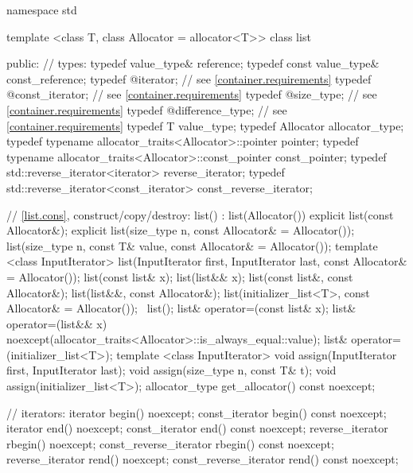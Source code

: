 \begin{codeblock}
namespace std {
  template <class T, class Allocator = allocator<T>>
  class list {
  public:
    // types:
    typedef value_type&                                         reference;
    typedef const value_type&                                   const_reference;
    typedef @\impdefnc@                              iterator;        // see \ref{container.requirements}
    typedef @\impdefnc@                              const_iterator;  // see \ref{container.requirements}
    typedef @\impdefnc@                              size_type;       // see \ref{container.requirements}
    typedef @\impdefnc@                              difference_type; // see \ref{container.requirements}
    typedef T                                                   value_type;
    typedef Allocator                                           allocator_type;
    typedef typename allocator_traits<Allocator>::pointer       pointer;
    typedef typename allocator_traits<Allocator>::const_pointer const_pointer;
    typedef std::reverse_iterator<iterator>                     reverse_iterator;
    typedef std::reverse_iterator<const_iterator>               const_reverse_iterator;

    // \ref{list.cons}, construct/copy/destroy:
    list() : list(Allocator()) { }
    explicit list(const Allocator&);
    explicit list(size_type n, const Allocator& = Allocator());
    list(size_type n, const T& value, const Allocator& = Allocator());
    template <class InputIterator>
      list(InputIterator first, InputIterator last, const Allocator& = Allocator());
    list(const list& x);
    list(list&& x);
    list(const list&, const Allocator&);
    list(list&&, const Allocator&);
    list(initializer_list<T>, const Allocator& = Allocator());
    ~list();
    list& operator=(const list& x);
    list& operator=(list&& x)
      noexcept(allocator_traits<Allocator>::is_always_equal::value);
    list& operator=(initializer_list<T>);
    template <class InputIterator>
      void assign(InputIterator first, InputIterator last);
    void assign(size_type n, const T& t);
    void assign(initializer_list<T>);
    allocator_type get_allocator() const noexcept;

    // iterators:
    iterator               begin() noexcept;
    const_iterator         begin() const noexcept;
    iterator               end() noexcept;
    const_iterator         end() const noexcept;
    reverse_iterator       rbegin() noexcept;
    const_reverse_iterator rbegin() const noexcept;
    reverse_iterator       rend() noexcept;
    const_reverse_iterator rend() const noexcept;

}}
\end{codeblock}
